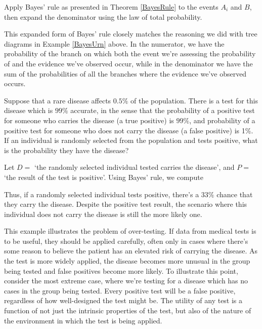 \begin{pf}
Apply Bayes' rule as presented in Theorem \ref{BayesRule} to the events $A_i$ and $B$, then expand the denominator using the law of total probability.
\end{pf}
\par
This expanded form of Bayes' rule closely matches the reasoning we did with tree diagrams in Example \ref{BayesUrn} above. In the numerator, we have the probability of the branch on which both the event we're assessing the probability of and the evidence we've observed occur, while in the denominator we have the sum of the probabilities of all the branches where the evidence we've observed occurs.
\begin{examp}
Suppose that a rare disease affects $0.5\%$ of the population. There is a test for this disease which is $99\%$ accurate, in the sense that the probability of a positive test for someone who carries the disease (a true positive) is $99\%$, and probability of a positive test for someone who does not carry the disease (a false positive) is 1\%. If an individual is randomly selected from the population and tests positive, what is the probability they have the disease?
\par
\noindent Let $D =$ `the randomly selected individual tested carries the disease', and $P =$ `the result of the test is positive'. Using Bayes' rule, we compute
\par
\noindent Thus, if a randomly selected individual tests positive, there's a $33\%$ chance that they carry the disease. Despite the positive test result, the scenario where this individual does not carry the disease is still the more likely one. 
\end{examp}
\par
This example illustrates the problem of over-testing. If data from medical tests is to be useful, they should be applied carefully, often only in cases where there's some reason to believe the patient has an elevated risk of carrying the disease. As the test is more widely applied, the disease becomes more unusual in the group being tested and false positives become more likely. To illustrate this point, consider the most extreme case, where we're testing for a disease which has no cases in the group being tested. Every positive test will be a false positive, regardless of how well-designed the test might be. The utility of any test is a function of not just the intrinsic properties of the test, but also of the nature of the environment in which the test is being applied. 
